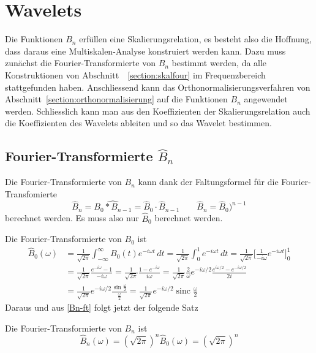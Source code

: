 %
%
%
\section{Wavelets
\label{section:spline-wavelets}}
Die Funktionen $B_n$ erfüllen eine Skalierungsrelation, es besteht also
die Hoffnung, dass daraus eine Multiskalen-Analyse konstruiert werden kann.
Dazu muss zunächst die Fourier-Transformierte von $B_n$ bestimmt werden,
da alle Konstruktionen von Abschnitt~ \ref{section:skalfour} im
Frequenzbereich stattgefunden haben.
Anschliessend kann das Orthonormalisierungsverfahren von
Abschnitt~\ref{section:orthonormalisierung} auf die Funktionen $B_n$
angewendet werden.
Schliesslich kann man aus den Koeffizienten der Skalierungsrelation
auch die Koeffizienten des Wavelets ableiten und so das Wavelet
bestimmen.

\subsection{Fourier-Transformierte $\hat{B}_n$
\label{subsection:spline-ft}}
Die Fourier-Transformierte von $B_n$ kann dank der Faltungsformel für die
Fourier-Transfomierte 
\begin{equation}
\hat{B}_n = \widehat{B_0 * B_{n-1}} = \hat{B}_0 \cdot \hat{B}_{n-1}
\qquad
\hat{B}_n = \hat{B}_0)^{n-1}
\label{Bn-ft}
\end{equation}
berechnet werden.
Es muss also nur $\hat{B}_0$ berechnet werden.

Die Fourier-Transformierte von $B_0$ ist
\begin{align*}
\hat{B}_0(\omega)
&=
\frac1{\sqrt{2\pi}}
\int_{-\infty}^{\infty}
B_0(t) e^{-i\omega t}\,dt
=
\frac1{\sqrt{2\pi}}
\int_0^1 e^{-i\omega t}\,dt
=
\frac1{\sqrt{2\pi}}
\biggl[
\frac{1}{-i\omega} 
e^{-i\omega t}
\biggr]_0^1
\\
&=
\frac1{\sqrt{2\pi}}
\frac{e^{-i\omega}-1}{-i\omega}
=
\frac1{\sqrt{2\pi}}
\frac{1-e^{-i\omega}}{i\omega}
=
\frac1{\sqrt{2\pi}}
\frac{2}{\omega}
e^{-i\omega/2}
\frac{e^{i\omega/2} - e^{-i\omega/2}}{2i}
\\
&=
\frac1{\sqrt{2\pi}}
e^{-i\omega/2}
\frac{\displaystyle\sin\frac{\omega}2}{\displaystyle\frac{\omega}2}
=
\frac1{\sqrt{2\pi}}
e^{-i\omega/2}
\operatorname{sinc}\frac{\omega}2
\end{align*}
Daraus und aus \eqref{Bn-ft} folgt jetzt der folgende Satz

\begin{satz}
\label{satz:Bn-ft}
Die Fourier-Transformierte von $B_n$ ist
\[
\hat{B}_n(\omega)
=
(\sqrt{2\pi})^n
\hat{B}_0(\omega)
=
(\sqrt{2\pi})^n
\]
\end{satz}

